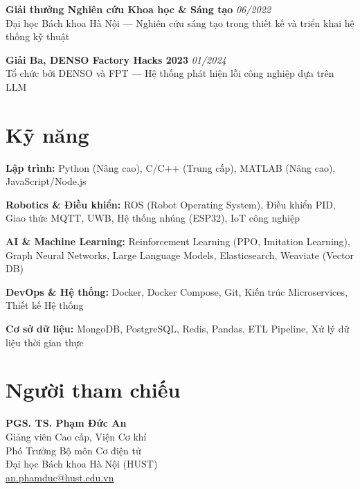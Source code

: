 \documentclass[11pt,a4paper]{article}
\begin{document}
\vspace{0.3em}

\noindent\textbf{Giải thưởng Nghiên cứu Khoa học \& Sáng tạo} \hfill \textit{06/2022} \\
Đại học Bách khoa Hà Nội — Nghiên cứu sáng tạo trong thiết kế và triển khai hệ thống kỹ thuật

\vspace{0.3em}

\noindent\textbf{Giải Ba, DENSO Factory Hacks 2023} \hfill \textit{01/2024} \\
Tổ chức bởi DENSO và FPT — Hệ thống phát hiện lỗi công nghiệp dựa trên LLM

\section{Kỹ năng}

\noindent\textbf{Lập trình:} Python (Nâng cao), C/C++ (Trung cấp), MATLAB (Nâng cao), JavaScript/Node.js

\vspace{0.15em}
\noindent\textbf{Robotics \& Điều khiển:} ROS (Robot Operating System), Điều khiển PID, Giao thức MQTT, UWB, Hệ thống nhúng (ESP32), IoT công nghiệp

\vspace{0.15em}
\noindent\textbf{AI \& Machine Learning:} Reinforcement Learning (PPO, Imitation Learning), Graph Neural Networks, Large Language Models, Elasticsearch, Weaviate (Vector DB)

\vspace{0.15em}
\noindent\textbf{DevOps \& Hệ thống:} Docker, Docker Compose, Git, Kiến trúc Microservices, Thiết kế Hệ thống

\vspace{0.15em}
\noindent\textbf{Cơ sở dữ liệu:} MongoDB, PostgreSQL, Redis, Pandas, ETL Pipeline, Xử lý dữ liệu thời gian thực

\section{Người tham chiếu}

\noindent\textbf{PGS. TS. Phạm Đức An} \\
Giảng viên Cao cấp, Viện Cơ khí \\
Phó Trưởng Bộ môn Cơ điện tử \\
Đại học Bách khoa Hà Nội (HUST) \\
\href{mailto:an.phamduc@hust.edu.vn}{an.phamduc@hust.edu.vn}
\end{document}
